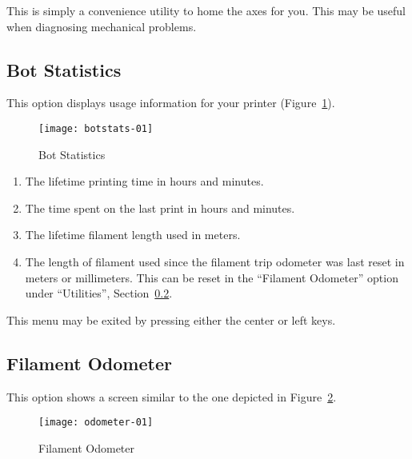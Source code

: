 This is simply a convenience utility to home the axes for you.  This may be useful when diagnosing mechanical problems.


\subsection{Bot Statistics} \label{sec:bot-stats}

This option displays usage information for your printer (Figure~\ref{fig:botstat}).

 \begin{figure}[!htbp]
  \centering
    \texttt{[image: botstats-01]}
    \caption{Bot Statistics}
  \label{fig:botstat}
\end{figure}

\begin{enumerate}
\item The lifetime printing time in hours and minutes.
\item The time spent on the last print in hours and minutes.
\item The lifetime filament length used in meters.
\item The length of filament used since the filament trip odometer was last reset in meters or millimeters.  This can be reset in the ``Filament Odometer'' option under ``Utilities'', Section~\ref{sec:filodo}.
\end{enumerate}

This menu may be exited by pressing either the center or left keys.


\subsection{Filament Odometer} \label{sec:filodo}

This option shows a screen similar to the one depicted in Figure~\ref{fig:odo}.

 \begin{figure}[!htbp]
  \centering
    \texttt{[image: odometer-01]}
    \caption{Filament Odometer}
  \label{fig:odo}
\end{figure}

